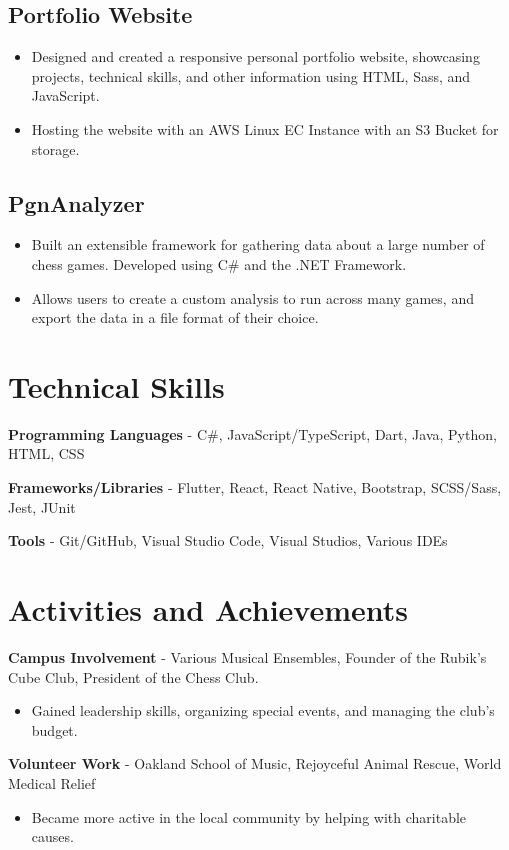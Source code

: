 \documentclass{article}
\newcommand{\resumesection}[1]{
	\section*{\Large\textbf{#1}}
	\hrulefill
	\vspace{1ex}
}
\begin{document}
\subsection*{Portfolio Website}

\begin{itemize}
	\item Designed and created a responsive personal portfolio website, showcasing projects, technical skills, and other \linebreak{}information using HTML, Sass, and JavaScript.
	\item Hosting the website with an AWS Linux EC Instance with an S3 Bucket for storage.
\end{itemize}

\subsection*{PgnAnalyzer}

\begin{itemize}
	\item Built an extensible framework for gathering data about a large number of chess games. Developed using C\# and the .NET Framework. 
	\item Allows users to create a custom analysis to run across many games, and export the data in a file format of their choice.
\end{itemize}


\resumesection{Technical Skills}

\vspace{.2ex}

\textbf{Programming Languages} - C\#,  JavaScript/TypeScript, Dart, Java, Python, HTML, CSS

\textbf{Frameworks/Libraries} - Flutter, React, React Native, Bootstrap, SCSS/Sass, Jest, JUnit

\textbf{Tools} - Git/GitHub, Visual Studio Code, Visual Studios, Various IDEs

\vspace{.5ex}


\resumesection{Activities and Achievements}

\vspace{.2ex}

\textbf {Campus Involvement} - Various Musical Ensembles, Founder of the Rubik's Cube Club, President of the Chess Club.


	\begin{itemize}
		\item Gained leadership skills, organizing special events, and managing the club's budget.
	\end{itemize}

\textbf {Volunteer Work} - Oakland School of Music, Rejoyceful Animal Rescue, World Medical Relief

	\begin{itemize}
		\item Became more active in the local community by helping with charitable causes.
	\end{itemize}
\end{document}
